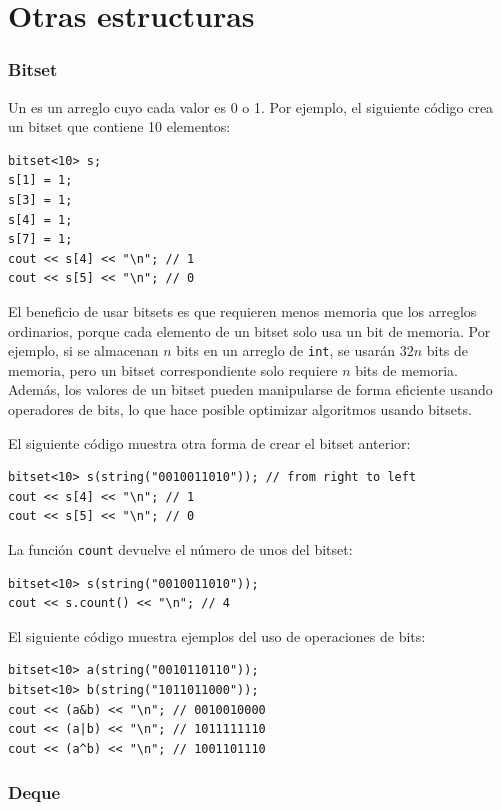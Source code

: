 \section{Otras estructuras}

\subsubsection{Bitset}


Un  es un arreglo
cuyo cada valor es 0 o 1.
Por ejemplo, el siguiente código crea
un bitset que contiene 10 elementos:
\begin{lstlisting}
bitset<10> s;
s[1] = 1;
s[3] = 1;
s[4] = 1;
s[7] = 1;
cout << s[4] << "\n"; // 1
cout << s[5] << "\n"; // 0
\end{lstlisting}

El beneficio de usar bitsets es que
requieren menos memoria que los arreglos ordinarios,
porque cada elemento de un bitset solo
usa un bit de memoria.
Por ejemplo,
si se almacenan $n$ bits en un arreglo de \texttt{int},
se usarán $32n$ bits de memoria,
pero un bitset correspondiente solo requiere $n$ bits de memoria.
Además, los valores de un bitset
pueden manipularse de forma eficiente usando
operadores de bits, lo que hace posible
optimizar algoritmos usando bitsets.

El siguiente código muestra otra forma de crear el bitset anterior:
\begin{lstlisting}
bitset<10> s(string("0010011010")); // from right to left
cout << s[4] << "\n"; // 1
cout << s[5] << "\n"; // 0
\end{lstlisting}

La función \texttt{count} devuelve el número
de unos del bitset:

\begin{lstlisting}
bitset<10> s(string("0010011010"));
cout << s.count() << "\n"; // 4
\end{lstlisting}

El siguiente código muestra ejemplos del uso de operaciones de bits:
\begin{lstlisting}
bitset<10> a(string("0010110110"));
bitset<10> b(string("1011011000"));
cout << (a&b) << "\n"; // 0010010000
cout << (a|b) << "\n"; // 1011111110
cout << (a^b) << "\n"; // 1001101110
\end{lstlisting}

\subsubsection{Deque}

